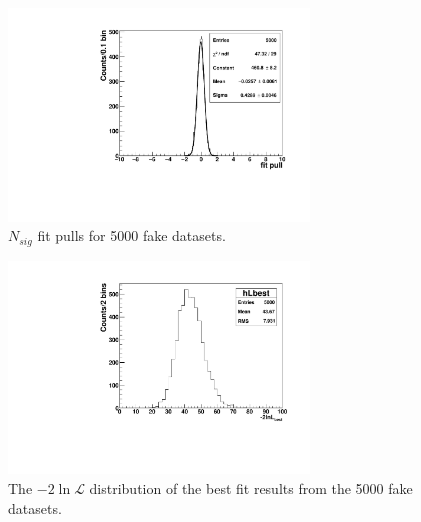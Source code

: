 \begin{figure}[!htb]
	\centering
	\includegraphics[width=8cm]{ensemble_fitPull.pdf}
	\caption{$N_{sig}$ fit pulls for 5000 fake datasets. \label{poisson_fitPull}}
\end{figure} 

\begin{figure}[!htb]
	\centering
	\includegraphics[width=8cm]{ensemble_lnLbest.pdf}
	\caption{The $-2\ln \mathcal{L}$ distribution of the best fit results from the 5000 fake datasets. \label{poisson_fitLnL}}
\end{figure}

